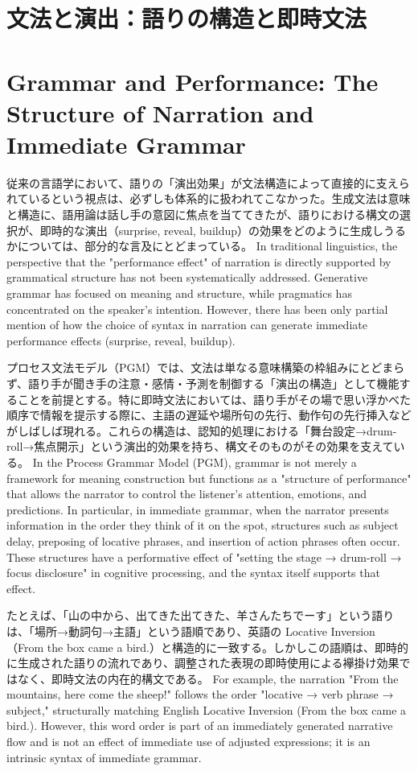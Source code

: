 
\ifJPN
\section{文法と演出：語りの構造と即時文法}
\else
\section{Grammar and Performance: The Structure of Narration and Immediate Grammar}
\fi

\ifJPN
従来の言語学において、語りの「演出効果」が文法構造によって直接的に支えられているという視点は、必ずしも体系的に扱われてこなかった。生成文法は意味と構造に、語用論は話し手の意図に焦点を当ててきたが、語りにおける構文の選択が、即時的な演出（surprise, reveal, buildup）の効果をどのように生成しうるかについては、部分的な言及にとどまっている。
\else
In traditional linguistics, the perspective that the "performance effect" of narration is directly supported by grammatical structure has not been systematically addressed. Generative grammar has focused on meaning and structure, while pragmatics has concentrated on the speaker's intention. However, there has been only partial mention of how the choice of syntax in narration can generate immediate performance effects (surprise, reveal, buildup).
\fi

\ifJPN
プロセス文法モデル（PGM）では、文法は単なる意味構築の枠組みにとどまらず、語り手が聞き手の注意・感情・予測を制御する「演出の構造」として機能することを前提とする。特に即時文法においては、語り手がその場で思い浮かべた順序で情報を提示する際に、主語の遅延や場所句の先行、動作句の先行挿入などがしばしば現れる。これらの構造は、認知的処理における「舞台設定→drum-roll→焦点開示」という演出的効果を持ち、構文そのものがその効果を支えている。
\else
In the Process Grammar Model (PGM), grammar is not merely a framework for meaning construction but functions as a "structure of performance" that allows the narrator to control the listener's attention, emotions, and predictions. In particular, in immediate grammar, when the narrator presents information in the order they think of it on the spot, structures such as subject delay, preposing of locative phrases, and insertion of action phrases often occur. These structures have a performative effect of "setting the stage → drum-roll → focus disclosure" in cognitive processing, and the syntax itself supports that effect.
\fi

\ifJPN
たとえば、「山の中から、出てきた出てきた、羊さんたちでーす」という語りは、「場所→動詞句→主語」という語順であり、英語の Locative Inversion（From the box came a bird.）と構造的に一致する。しかしこの語順は、即時的に生成された語りの流れであり、調整された表現の即時使用による襷掛け効果ではなく、即時文法の内在的構文である。
\else
For example, the narration "From the mountains, here come the sheep!" follows the order "locative → verb phrase → subject," structurally matching English Locative Inversion (From the box came a bird.). However, this word order is part of an immediately generated narrative flow and is not an effect of immediate use of adjusted expressions; it is an intrinsic syntax of immediate grammar.
\fi

